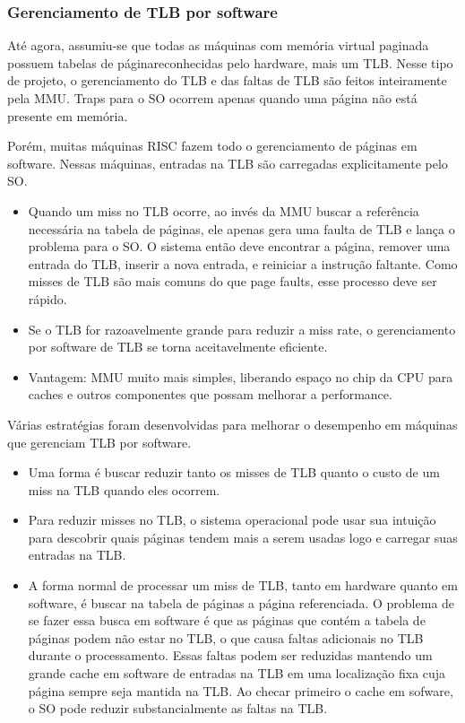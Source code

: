 \documentclass[10pt]{article}
\begin{document}
\subsubsection{Gerenciamento de TLB por software}

\par\indent Até agora, assumiu-se que todas as máquinas com memória virtual paginada 
possuem tabelas de páginareconhecidas pelo hardware, mais um TLB. Nesse tipo de projeto, 
o gerenciamento do TLB e das faltas de TLB são feitos inteiramente pela MMU. 
Traps para o SO ocorrem apenas quando uma página não está presente em memória. 

\par Porém, muitas máquinas RISC fazem todo o gerenciamento de páginas em software. 
Nessas máquinas, entradas na TLB são carregadas explicitamente pelo SO.

\begin{itemize}
    \item Quando um miss no TLB ocorre, ao invés da MMU buscar a referência necessária
        na tabela de páginas, ele apenas gera uma faulta de TLB e lança o problema para
        o SO. O sistema então deve encontrar a página, remover uma entrada do TLB, inserir
        a nova entrada, e reiniciar a instrução faltante. Como misses de TLB são mais comuns
        do que page faults, esse processo deve ser rápido.
    \item Se o TLB for razoavelmente grande para reduzir a miss rate, o gerenciamento por software
        de TLB se torna aceitavelmente eficiente. 
    \item Vantagem: MMU muito mais simples, liberando espaço no chip da CPU para caches e outros
        componentes que possam melhorar a performance.
\end{itemize}
\par Várias estratégias foram desenvolvidas para melhorar o desempenho em máquinas que gerenciam
TLB por software. 

\begin{itemize}
    \item Uma forma é buscar reduzir tanto os misses de TLB quanto o custo de um miss na TLB quando
        eles ocorrem. 
    \item Para reduzir misses no TLB, o sistema operacional pode usar sua intuição para descobrir
        quais páginas tendem mais a serem usadas logo e carregar suas entradas na TLB. 
    \item A forma normal de processar um miss de TLB, tanto em hardware quanto em software, 
        é buscar na tabela de páginas a página referenciada. O problema de se fazer essa
        busca em software é que as páginas que contém a tabela de páginas podem não estar
        no TLB, o que causa faltas adicionais no TLB durante o processamento. Essas faltas
        podem ser reduzidas mantendo um grande cache em software de entradas na TLB em uma 
        localização fixa cuja página sempre seja mantida na TLB. Ao checar primeiro o cache
        em sofware, o SO pode reduzir substancialmente as faltas na TLB.
\end{itemize}
\end{document}
